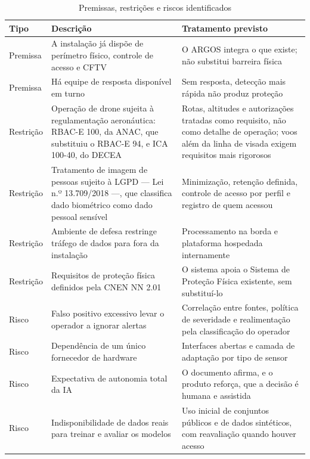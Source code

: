 \documentclass[12pt,a4paper,oneside]{article}
\newcommand{\fonte}[1]{\par\vspace{5pt}{\footnotesize\singlespacing Fonte: #1\par}}
\newcommand{\cab}[1]{\textbf{\footnotesize #1}}
\begin{document}
\begin{table}[H]
\centering
\caption{Premissas, restrições e riscos identificados}
\label{tab:riscos}
{\small\singlespacing
\begin{tabularx}{\textwidth}{L{2.0cm} L{4.4cm} X}
\toprule
\cab{Tipo} & \cab{Descrição} & \cab{Tratamento previsto} \\
\midrule
Premissa & A instalação já dispõe de perímetro físico, controle de acesso e
CFTV & O ARGOS integra o que existe; não substitui barreira física \\
Premissa & Há equipe de resposta disponível em turno & Sem resposta, detecção
mais rápida não produz proteção \\
Restrição & Operação de drone sujeita à regulamentação aeronáutica: RBAC-E 100,
da ANAC, que substituiu o RBAC-E 94, e ICA 100-40, do DECEA & Rotas, altitudes
e autorizações tratadas como requisito, não como detalhe de operação; voos além
da linha de visada exigem requisitos mais rigorosos \\
Restrição & Tratamento de imagem de pessoas sujeito à LGPD — Lei n.º 13.709/2018
—, que classifica dado biométrico como dado pessoal sensível & Minimização,
retenção definida, controle de acesso por perfil e registro de quem acessou \\
Restrição & Ambiente de defesa restringe tráfego de dados para fora da
instalação & Processamento na borda e plataforma hospedada internamente \\
Restrição & Requisitos de proteção física definidos pela CNEN NN 2.01 & O
sistema apoia o Sistema de Proteção Física existente, sem substituí-lo \\
Risco & Falso positivo excessivo levar o operador a ignorar alertas & Correlação
entre fontes, política de severidade e realimentação pela classificação do
operador \\
Risco & Dependência de um único fornecedor de hardware & Interfaces abertas e
camada de adaptação por tipo de sensor \\
Risco & Expectativa de autonomia total da IA & O documento afirma, e o produto
reforça, que a decisão é humana e assistida \\
Risco & Indisponibilidade de dados reais para treinar e avaliar os modelos &
Uso inicial de conjuntos públicos e de dados sintéticos, com reavaliação quando
houver acesso \\
\bottomrule
\end{tabularx}}
\fonte{elaborado pelos autores (2026).}
\end{table}
\end{document}
